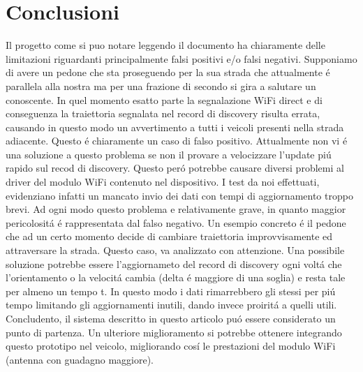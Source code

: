 \documentclass[conference]{IEEEtran}
\begin{document}
\section{Conclusioni}
Il progetto come si puo notare leggendo il documento ha chiaramente delle limitazioni riguardanti principalmente falsi positivi e/o falsi negativi. Supponiamo di avere un pedone che sta proseguendo per la sua strada che attualmente \'e parallela alla nostra ma per una frazione di secondo si gira a salutare un conoscente. In quel momento esatto parte la segnalazione WiFi direct e di conseguenza la traiettoria segnalata nel record di discovery risulta errata, causando in questo modo un avvertimento a tutti i veicoli presenti nella strada adiacente. Questo \'e chiaramente un caso di falso positivo. Attualmente non vi \'e una soluzione a questo problema se non il provare a velocizzare l'update pi\'u rapido sul recod di discovery. Questo per\'o potrebbe causare diversi problemi al driver del modulo WiFi contenuto nel dispositivo. I test da noi effettuati, evidenziano infatti un mancato invio dei dati con tempi di aggiornamento troppo brevi. Ad ogni modo questo problema e relativamente grave, in quanto maggior pericolosit\'a \'e rappresentata dal falso negativo. Un esempio concreto \'e il pedone che ad un certo momento decide di cambiare traiettoria improvvisamente ed attraversare la strada. Questo caso, va analizzato con attenzione. Una possibile soluzione potrebbe essere l'aggiornameto del record di discovery ogni volt\'a che l'orientamento o la velocit\'a cambia (delta \'e maggiore di una soglia) e resta tale per almeno un tempo t. In questo modo i dati rimarrebbero gli stessi per pi\'u tempo limitando gli aggiornamenti inutili, dando invece proirit\'a a quelli utili.
Concludento, il sistema descritto in questo articolo pu\'o essere considerato un punto di partenza. Un ulteriore miglioramento si potrebbe ottenere integrando questo prototipo nel veicolo, migliorando cos\'i le prestazioni del modulo WiFi (antenna con guadagno maggiore).
\end{document}
